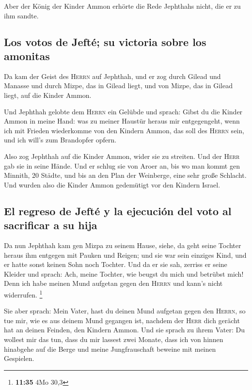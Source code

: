  Aber der König der Kinder Ammon erhörte die Rede
Jephthahs nicht, die er zu ihm sandte.

\hypertarget{los-votos-de-jeftuxe9-su-victoria-sobre-los-amonitas}{%
\subsection{Los votos de Jefté; su victoria sobre los
amonitas}\label{los-votos-de-jeftuxe9-su-victoria-sobre-los-amonitas}}

 Da kam der Geist des \textsc{Herrn} auf Jephthah, und er
zog durch Gilead und Manasse und durch Mizpe, das in Gilead liegt, und
von Mizpe, das in Gilead liegt, auf die Kinder Ammon.

 Und Jephthah gelobte dem \textsc{Herrn} ein Gelübde und
sprach: Gibst du die Kinder Ammon in meine Hand:  was zu
meiner Haustür heraus mir entgegengeht, wenn ich mit Frieden wiederkomme
von den Kindern Ammon, das soll des \textsc{Herrn} sein, und ich will's
zum Brandopfer opfern.

 Also zog Jephthah auf die Kinder Ammon, wider sie zu
streiten. Und der \textsc{Herr} gab sie in seine Hände. 
Und er schlug sie von Aroer an, bis wo man kommt gen Minnith, 20 Städte,
und bis an den Plan der Weinberge, eine sehr große Schlacht. Und wurden
also die Kinder Ammon gedemütigt vor den Kindern Israel.

\hypertarget{el-regreso-de-jeftuxe9-y-la-ejecuciuxf3n-del-voto-al-sacrificar-a-su-hija}{%
\subsection{El regreso de Jefté y la ejecución del voto al sacrificar a
su
hija}\label{el-regreso-de-jeftuxe9-y-la-ejecuciuxf3n-del-voto-al-sacrificar-a-su-hija}}

 Da nun Jephthah kam gen Mizpa zu seinem Hause, siehe, da
geht seine Tochter heraus ihm entgegen mit Pauken und Reigen; und sie
war sein einziges Kind, und er hatte sonst keinen Sohn noch Tochter.
 Und da er sie sah, zerriss er seine Kleider und sprach:
Ach, meine Tochter, wie beugst du mich und betrübst mich! Denn ich habe
meinen Mund aufgetan gegen den \textsc{Herrn} und kann's nicht
widerrufen. \footnote{\textbf{11:35} 4Mo 30,3}

 Sie aber sprach: Mein Vater, hast du deinen Mund
aufgetan gegen den \textsc{Herrn}, so tue mir, wie es aus deinem Mund
gegangen ist, nachdem der \textsc{Herr} dich gerächt hat an deinen
Feinden, den Kindern Ammon.  Und sie sprach zu ihrem
Vater: Du wollest mir das tun, dass du mir lassest zwei Monate, dass ich
von hinnen hinabgehe auf die Berge und meine Jungfrauschaft beweine mit
meinen Gespielen.

